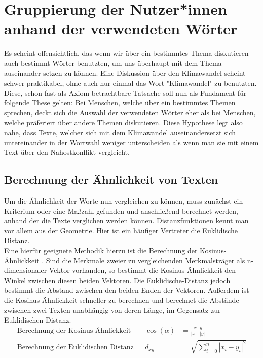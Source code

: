 \chapter{Gruppierung der Nutzer*innen anhand der verwendeten Wörter }
\label{chap:cluster_hashtags}
Es scheint offensichtlich, das wenn wir über ein bestimmtes Thema diskutieren auch bestimmt Wörter benutzten, um uns überhaupt mit dem Thema auseinander setzen zu können. Eine Diskussion über den Klimawandel scheint schwer praktikabel, ohne auch nur einmal das Wort "{}Klimawandel"{} zu benutzten. Diese, schon fast als Axiom betrachtbare Tatsache soll nun als Fundament für folgende These gelten: Bei Menschen, welche über ein bestimmtes Themen sprechen, deckt sich die Auswahl der verwendeten Wörter eher als bei Menschen, welche präferiert über andere Themen diskutieren. Diese Hypothese legt also nahe, dass Texte, welcher sich mit dem Klimawandel auseinandersetzt sich untereinander in der Wortwahl weniger unterscheiden als wenn man sie mit einem Text über den Nahostkonflikt vergleicht.

\section{Berechnung der Ähnlichkeit von Texten}
\label{chap:berechnung_texteahnlichkeit}
Um die Ähnlichkeit der Worte nun vergleichen zu können, muss zunächst ein Kriterium oder eine Maßzahl gefunden und anschließend berechnet werden, anhand der die Texte verglichen werden können. Distanzfunktionen kennt man vor allem aus der Geometrie. Hier ist ein häufiger Vertreter die Euklidische Distanz. \\ \newline
Eine hierfür geeignete Methodik hierzu ist die Berechnung der Kosinus-Ähnlickkeit . Sind die Merkmale zweier zu vergleichenden Merkmalsträger als n-dimensionaler Vektor vorhanden, so bestimmt die Kosinus-Ähnlickkeit den Winkel zwischen diesen beiden Vektoren. Die Euklidische-Distanz jedoch  bestimmt die Abstand zwischen den beiden Enden der Vektoren. Außerdem ist die Kosinus-Ähnlickkeit schneller zu berechnen und berechnet die Abstände zwischen zwei Texten unabhängig von deren Länge, im Gegensatz zur Euklidischen-Distanz.
\begin{equation}
	\begin{aligned} 
		\text{Berechnung der Kosinus-Ähnlickkeit}&& 
		\cos(\alpha)&=\frac{x\cdot y}{\left|x\right|\cdot \left|y\right|} \\
		\text{Berechnung der Euklidischen Distanz}&& 
		{d}_{xy}&=\sqrt{\sum _{i=0}^{n}{\left|{x}_{i}-{y}_{i}\right|}^{2}} \\  
	\end{aligned} 
	\label{eq:distance}
\end{equation}

